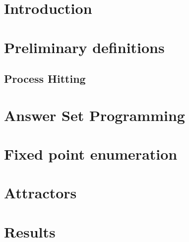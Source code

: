 \documentclass{bmcart}
\begin{document}
\begin{frontmatter}
\begin{fmbox}
\begin{abstractbox}
\begin{keyword}
\end{keyword}


\end{abstractbox}
%
\end{fmbox}%

\end{frontmatter}



\section{Introduction}


\section{Preliminary definitions}
\label{sec:defs}
\subsection{Process Hitting}


\section{Answer Set Programming}


\section{Fixed point enumeration}
\label{sec:fixpoint}


\section{Attractors }
\label{sec:attractors}


%

\section{Results }
\label{sec:results}

\end{document}

